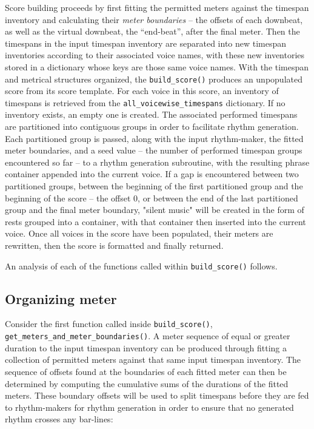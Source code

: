 \noindent Score building proceeds by first fitting the permitted meters against
the timespan inventory and calculating their \emph{meter boundaries} -- the
offsets of each downbeat, as well as the virtual downbeat, the
\enquote{end-beat}, after the final meter. Then the timespans in the input
timespan inventory are separated into new timespan inventories according to
their associated voice names, with these new inventories stored in a dictionary
whose keys are those same voice names. With the timespan and metrical
structures organized, the \texttt{build\_score()} produces an unpopulated score
from its score template. For each voice in this score, an inventory of
timespans is retrieved from the \texttt{all\_voicewise\_timespans} dictionary.
If no inventory exists, an empty one is created. The associated performed
timespans are partitioned into contiguous groups in order to facilitate rhythm
generation. Each partitioned group is passed, along with the input
rhythm-maker, the fitted meter boundaries, and a seed value -- the number of
performed timespan groups encountered so far -- to a rhythm generation
subroutine, with the resulting phrase container appended into the current
voice. If a gap is encountered between two partitioned groups, between the
beginning of the first partitioned group and the beginning of the score -- the
offset 0, or between the end of the last partitioned group and the final meter
boundary, "silent music" will be created in the form of rests grouped into a
container, with that container then inserted into the current voice. Once all
voices in the score have been populated, their meters are rewritten, then the
score is formatted and finally returned.

An analysis of each of the functions called within \texttt{build\_score()}
follows.

\subsection{Organizing meter}
\label{ssec:organizing-meter}

Consider the first function called inside \texttt{build\_score()},
\texttt{get\_meters\_and\_meter\_boundaries()}. A meter sequence of equal or
greater duration to the input timespan inventory can be produced through
fitting a collection of permitted meters against that same input timespan
inventory. The sequence of offsets found at the boundaries of each fitted meter
can then be determined by computing the cumulative sums of the durations of the
fitted meters. These boundary offsets will be used to split timespans before
they are fed to rhythm-makers for rhythm generation in order to ensure that no
generated rhythm crosses any bar-lines:


